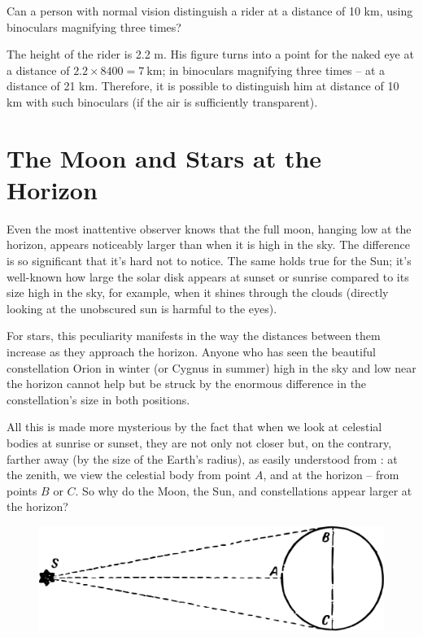 \ques Can a person with normal vision distinguish a rider at a distance of 10 km, using binoculars magnifying three times?

\ans The height of the rider is 2.2 m. His figure turns into a point for the naked eye at a distance of $2.2 \times 8400 = \SI{7}{\kilo\meter}$; in binoculars magnifying three times -- at a distance of 21 km. Therefore, it is possible to distinguish him at distance of 10 km with such binoculars (if the air is sufficiently transparent).

\section{The Moon and Stars at the Horizon}
\label{sec-3.13}

Even the most inattentive observer knows that the full moon, hanging low at the horizon, appears noticeably larger than when it is high in the sky. The difference is so significant that it's hard not to notice. The same holds true for the Sun; it's well-known how large the solar disk appears at sunset or sunrise compared to its size high in the sky, for example, when it shines through the clouds (directly looking at the unobscured sun is harmful to the eyes).

For stars, this peculiarity manifests in the way the distances between them increase as they approach the horizon. Anyone who has seen the beautiful constellation Orion in winter (or Cygnus in summer) high in the sky and low near the horizon cannot help but be struck by the enormous difference in the constellation's size in both positions.


All this is made more mysterious by the fact that when we look at celestial bodies at sunrise or sunset, they are not only not closer but, on the contrary, farther away (by the size of the Earth's radius), as easily understood from : at the zenith, we view the celestial body from point $A$, and at the horizon -- from points $B$ or $C$. So why do the Moon, the Sun, and constellations appear larger at the horizon?


\begin{figure}[h!]
\centering
\includegraphics[width=\textwidth]{figures/ch-03/fig-074.pdf}
\end{figure}


